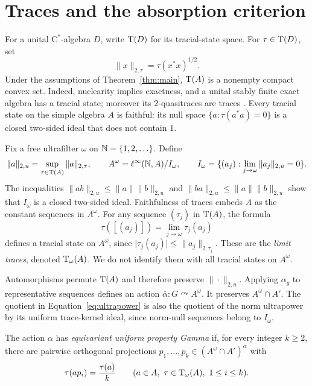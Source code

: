 \section{Traces and the absorption criterion}\label{sec:preliminaries}

For a unital \(\mathrm C^*\)-algebra \(D\), write \(\operatorname{T}(D)\) for its
tracial-state space. For \(\tau\in\operatorname{T}(D)\), set
\[
 \|x\|_{2,\tau}=\tau(x^*x)^{1/2}.
\]
Under the assumptions of Theorem~\ref{thm:main}, \(\operatorname{T}(A)\) is a
nonempty compact convex set. Indeed, nuclearity implies exactness,
and a unital stably finite exact algebra has a tracial state;
moreover its \(2\)-quasitraces are traces
\cite[Theorem~5.11 and Corollary~5.12]{Haagerup2014}.
Every tracial state on the simple algebra \(A\) is faithful:
its null space \(\{a:\tau(a^*a)=0\}\) is a closed two-sided ideal
that does not contain \(1\).

Fix a free ultrafilter \(\omega\) on \(\mathbb N=\{1,2,\ldots\}\). Define
\begin{equation}\label{eq:ultrapower}
 \|a\|_{2,u}=\sup_{\tau\in\operatorname{T}(A)}\|a\|_{2,\tau},\qquad
 A^\omega=\ell^\infty(\mathbb N,A)/I_\omega,\qquad
 I_\omega=\{(a_j):\lim_{j\to\omega}\|a_j\|_{2,u}=0\}.
\end{equation}
The inequalities
\(\|ab\|_{2,u}\leq\|a\|\|b\|_{2,u}\) and
\(\|ba\|_{2,u}\leq\|a\|\|b\|_{2,u}\) show that \(I_\omega\)
is a closed two-sided ideal. Faithfulness of traces embeds \(A\)
as the constant sequences in \(A^\omega\).
For any sequence \((\tau_j)\) in \(\operatorname{T}(A)\), the formula
\[
 \tau([(a_j)])=\lim_{j\to\omega}\tau_j(a_j)
\]
defines a tracial state on \(A^\omega\), since
\(\lvert\tau_j(a_j)\rvert\leq\|a_j\|_{2,\tau_j}\).
These are the \emph{limit traces}, denoted \(\operatorname{T}_\omega(A)\).
We do not identify them with all tracial states on \(A^\omega\).

Automorphisms permute \(\operatorname{T}(A)\) and therefore preserve
\(\|\cdot\|_{2,u}\). Applying \(\alpha_g\) to representative sequences
defines an action \(\bar\alpha:G\curvearrowright A^\omega\).
It preserves \(A^\omega\cap A'\). The quotient in
Equation~\eqref{eq:ultrapower} is also the quotient of the norm
ultrapower by its uniform trace-kernel ideal, since norm-null
sequences belong to \(I_\omega\).

\begin{definition}\label{def:gamma}
The action \(\alpha\) has \emph{equivariant uniform property Gamma}
if, for every integer \(k\geq2\), there are pairwise orthogonal
projections \(p_1,\ldots,p_k\in(A^\omega\cap A')^{\bar\alpha}\) with
\begin{equation}\label{eq:gamma}
 \tau(ap_i)=\frac{\tau(a)}{k}
 \qquad(a\in A,\ \tau\in\operatorname{T}_\omega(A),\ 1\leq i\leq k).
\end{equation}
\end{definition}

